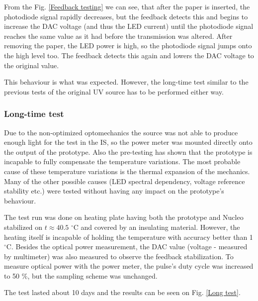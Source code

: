 From the Fig. \ref{Feedback testing} we can see, that after the paper is inserted, the photodiode signal rapidly decreases, but the feedback detects this and begins to increase the DAC voltage (and thus the LED current) until the photodiode signal reaches the same value as it had before the transmission was altered. After removing the paper, the LED power is high, so the photodiode signal jumps onto the high level too. The feedback detects this again and lowers the DAC voltage to the original value. 
\par
This behaviour is what was expected. However, the long-time test similar to the previous tests of the original UV source has to be performed either way. 


\subsubsection{Long-time test}

Due to the non-optimized optomechanics the source was not able to produce enough light for the test in the IS, so the power meter was mounted directly onto the output of the prototype. Also the pre-testing has shown that the prototype is incapable to fully compensate the temperature variations. The most probable cause of these temperature variations is the thermal expansion of the mechanics. Many of the other possible causes (LED spectral dependency, voltage reference stability etc.) were tested without having any impact on the prototype's behaviour. 


\par
The test run was done on heating plate having both the prototype and Nucleo stabilized on $t \approx 40.5$ $^\circ $C and covered by an insulating material. However, the heating itself is incapable of holding the temperature with accuracy better than 1 $^\circ $C. Besides the optical power measurement, the DAC value (voltage - measured by multimeter) was also measured to observe the feedback stabilization. To measure optical power with the power meter, the pulse's duty cycle was increased to 50 $\%$, but the sampling scheme was unchanged.

\par

The test lasted about 10 days and the results can be seen on Fig. \ref{Long test}.


